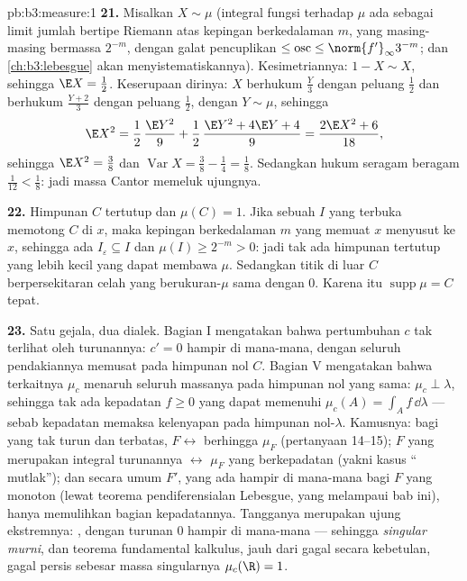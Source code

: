 \begin{solution}{pb:b3:measure:1}
\textbf{21.} Misalkan $X \sim \mu$ (integral fungsi 
terhadap $\mu$ ada sebagai limit jumlah bertipe Riemann
atas kepingan berkedalaman $m$, yang masing-masing bermassa $2^{-m}$, dengan
galat pencuplikan $\leq \operatorname{osc} \leq
\norm{f'}_\infty3^{-m}$; dan \cref{ch:b3:lebesgue} akan
menyistematiskannya). Kesimetriannya: $1 - X \sim X$, sehingga $\E X =
\frac12$. Keserupaan dirinya: $X$ berhukum $\frac Y3$ dengan
peluang $\frac12$ dan berhukum $\frac{Y+2}3$ dengan peluang
$\frac12$, dengan $Y \sim \mu$, sehingga
\[
\E X^2 = \frac12\,\frac{\E Y^2}9 + \frac12\,
\frac{\E Y^2 + 4\E Y + 4}{9} = \frac{2\E X^2 + 6}{18},
\]
sehingga $\E X^2 = \frac38$ dan $\operatorname{Var}X = \frac38
- \frac14 = \frac18$. Sedangkan hukum seragam beragam
$\frac1{12} < \frac18$: jadi massa Cantor memeluk ujungnya.

\textbf{22.} Himpunan $C$ tertutup dan $\mu(C) = 1$. Jika sebuah $I$ yang terbuka
memotong $C$ di $x$, maka kepingan berkedalaman $m$ yang memuat $x$ menyusut
ke $x$, sehingga ada $I_\varepsilon \subseteq I$ dan $\mu(I) \geq
2^{-m} > 0$: jadi tak ada himpunan tertutup yang lebih kecil yang dapat membawa $\mu$. Sedangkan titik
di luar $C$ berpersekitaran celah yang berukuran-$\mu$ sama dengan $0$. Karena itu
$\operatorname{supp}\mu = C$ tepat.

\textbf{23.} Satu gejala, dua dialek. Bagian I mengatakan bahwa
pertumbuhan $c$ tak terlihat oleh turunannya: $c' = 0$ hampir di mana-mana,
dengan seluruh pendakiannya memusat pada himpunan nol $C$. Bagian V
mengatakan bahwa  terkaitnya $\mu_c$ menaruh seluruh massanya pada
himpunan nol yang sama: $\mu_c \perp \lambda$, sehingga tak ada kepadatan $f \geq
0$ yang dapat memenuhi $\mu_c(A) = \int_Af\,\dd\lambda$ --- sebab kepadatan
memaksa kelenyapan pada himpunan nol-$\lambda$. Kamusnya: bagi yang
tak turun dan terbatas, $F \leftrightarrow$  berhingga
$\mu_F$ (pertanyaan 14--15); $F$ yang merupakan integral turunannya
$\leftrightarrow$ $\mu_F$ yang berkepadatan (yakni kasus ``
mutlak''); dan secara umum $F'$, yang ada hampir di mana-mana
bagi $F$ yang monoton (lewat teorema pendiferensialan Lebesgue, yang melampaui
bab ini), hanya memulihkan bagian kepadatannya. Tangganya
merupakan ujung ekstremnya: , dengan turunan $0$ hampir di mana-mana ---
sehingga  \emph{singular murni}, dan teorema
fundamental kalkulus, jauh dari gagal secara kebetulan, gagal persis
sebesar massa singularnya $\mu_c(\R) = 1$.


\end{solution}
